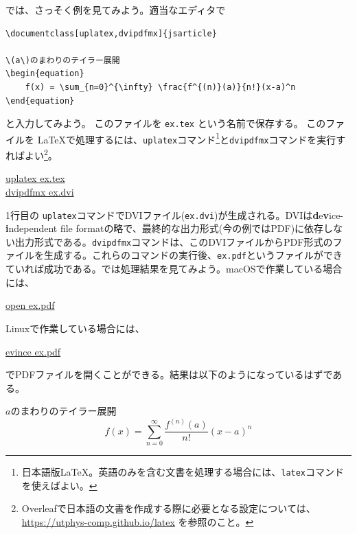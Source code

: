 では、さっそく例を見てみよう。適当なエディタで
\begin{reidai}
    \label{reidai:latex:ex}
    \begin{verbatim}
\documentclass[uplatex,dvipdfmx]{jsarticle}

\(a\)のまわりのテイラー展開
\begin{equation}
    f(x) = \sum_{n=0}^{\infty} \frac{f^{(n)}(a)}{n!}(x-a)^n
\end{equation}

\end{verbatim}
\end{reidai} \noindent
と入力してみよう。
このファイルを \texttt{ex.tex} という名前で保存する。
このファイルを \LaTeX で処理するには、\texttt{uplatex}コマンド\footnote{日本語版\LaTeX 。英語のみを含む文書を処理する場合には、\texttt{latex}コマンドを使えばよい。}と\texttt{dvipdfmx}コマンドを実行すればよい\footnote{Overleafで日本語の文書を作成する際に必要となる設定については、 \url{https://utphys-comp.github.io/latex} を参照のこと。}。
\begin{commandline2}
    \prompt \underline{uplatex ex.tex}\\
    \prompt \underline{dvipdfmx ex.dvi}
\end{commandline2} \noindent
1行目の \texttt{uplatex}コマンドでDVIファイル(\texttt{ex.dvi})が生成される。DVIは{\textbf{d}e\textbf{v}ice-\textbf{i}ndependent file format}の略で、最終的な出力形式(今の例ではPDF)に依存しない出力形式である。\texttt{dvipdfmx}コマンドは、このDVIファイルからPDF形式のファイルを生成する。これらのコマンドの実行後、\texttt{ex.pdf}というファイルができていれば成功である。では処理結果を見てみよう。macOSで作業している場合には、
\begin{commandline2}
    \prompt \underline{open ex.pdf}
\end{commandline2} \noindent
Linuxで作業している場合には、
\begin{commandline2}
    \prompt \underline{evince ex.pdf}
\end{commandline2} \noindent
でPDFファイルを開くことができる。結果は以下のようになっているはずである。
\renewcommand{\theequation}{1}
\begin{kekka}
    \label{kekka:ex}
    \(a\)のまわりのテイラー展開
    \begin{equation}
        f(x) = \sum_{n=0}^{\infty} \frac{f^{(n)}(a)}{n!}(x-a)^n
    \end{equation}
    \vspace{0pt}
\end{kekka}

